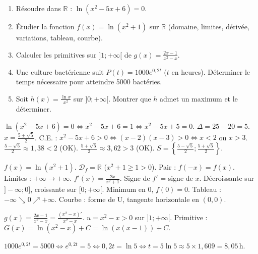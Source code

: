 \documentclass[11pt]{article}
\begin{document}
\begin{exercice}
\begin{enumerate}
    \item Résoudre dans $\mathbb{R}$ : $\ln(x^2 - 5x + 6) = 0$.
    \item Étudier la fonction $f(x) = \ln(x^2 + 1)$ sur $\mathbb{R}$ (domaine, limites, dérivée, variations, tableau, courbe).
    \item Calculer les primitives sur $]1;+\infty[$ de $g(x) = \frac{2x-1}{x^2-x}$.
    \item Une culture bactérienne suit $P(t) = 1000 e^{0,2t}$ ($t$ en heures). Déterminer le temps nécessaire pour atteindre 5000 bactéries.
    \item Soit $h(x) = \frac{\ln x}{x^2}$ sur $]0;+\infty[$. Montrer que $h$ admet un maximum et le déterminer.
\end{enumerate}
\end{exercice}

\begin{corrige}[Exercice n°1]
$\ln(x^2-5x+6)=0 \iff x^2-5x+6 = 1 \iff x^2-5x+5=0$. $\Delta = 25-20=5$. $x = \frac{5\pm\sqrt{5}}{2}$.
C.E. : $x^2-5x+6 > 0 \iff (x-2)(x-3)>0 \iff x<2$ ou $x>3$.
$\frac{5-\sqrt{5}}{2} \approx 1,38 < 2$ (OK). $\frac{5+\sqrt{5}}{2} \approx 3,62 > 3$ (OK).
$S = \left\{ \frac{5-\sqrt{5}}{2} ; \frac{5+\sqrt{5}}{2} \right\}$.
\end{corrige}

\begin{corrige}[Exercice n°2]
$f(x)=\ln(x^2+1)$. $\mathcal{D}_f=\mathbb{R}$ ($x^2+1\ge 1>0$).
Pair : $f(-x)=f(x)$.
Limites : $+\infty \to +\infty$.
$f'(x) = \frac{2x}{x^2+1}$. Signe de $f'$ = signe de $x$.
Décroissante sur $]-\infty;0]$, croissante sur $[0;+\infty[$. Minimum en $0$, $f(0)=0$.
Tableau : $-\infty \searrow 0 \nearrow +\infty$.
Courbe : forme de U, tangente horizontale en $(0,0)$.
\end{corrige}

\begin{corrige}[Exercice n°3]
$g(x) = \frac{2x-1}{x^2-x} = \frac{(x^2-x)'}{x^2-x}$. $u=x^2-x>0$ sur $]1;+\infty[$.
Primitive : $G(x) = \ln(x^2-x) + C = \ln(x(x-1)) + C$.
\end{corrige}

\begin{corrige}[Exercice n°4]
$1000 e^{0,2t} = 5000 \iff e^{0,2t} = 5 \iff 0,2t = \ln 5 \iff t = 5\ln 5 \approx 5 \times 1,609 = 8,05\,\text{h}$.
\end{corrige}
\end{document}
